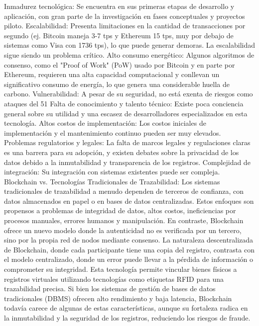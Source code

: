 Inmadurez tecnológica: Se encuentra en sus primeras etapas de desarrollo y aplicación, con gran parte de la investigación en fases conceptuales y proyectos piloto.
Escalabilidad: Presenta limitaciones en la cantidad de transacciones por segundo (ej. Bitcoin maneja 3-7 tps y Ethereum 15 tps, muy por debajo de sistemas como Visa con 1736 tps), lo que puede generar demoras. La escalabilidad sigue siendo un problema crítico.
Alto consumo energético: Algunos algoritmos de consenso, como el "Proof of Work" (PoW) usado por Bitcoin y en parte por Ethereum, requieren una alta capacidad computacional y conllevan un significativo consumo de energía, lo que genera una considerable huella de carbono.
Vulnerabilidad: A pesar de su seguridad, no está exenta de riesgos como ataques del 51%
Falta de conocimiento y talento técnico: Existe poca conciencia general sobre su utilidad y una escasez de desarrolladores especializados en esta tecnología.
Altos costos de implementación: Los costos iniciales de implementación y el mantenimiento continuo pueden ser muy elevados.
Problemas regulatorios y legales: La falta de marcos legales y regulaciones claras es una barrera para su adopción, y existen debates sobre la privacidad de los datos debido a la inmutabilidad y transparencia de los registros.
Complejidad de integración: Su integración con sistemas existentes puede ser compleja.
Blockchain vs. Tecnologías Tradicionales de Trazabilidad: Los sistemas tradicionales de trazabilidad a menudo dependen de terceros de confianza, con datos almacenados en papel o en bases de datos centralizadas. Estos enfoques son propensos a problemas de integridad de datos, altos costos, ineficiencias por procesos manuales, errores humanos y manipulación. En contraste, Blockchain ofrece un nuevo modelo donde la autenticidad no es verificada por un tercero, sino por la propia red de nodos mediante consenso. La naturaleza descentralizada de Blockchain, donde cada participante tiene una copia del registro, contrasta con el modelo centralizado, donde un error puede llevar a la pérdida de información o comprometer su integridad. Esta tecnología permite vincular bienes físicos a registros virtuales utilizando tecnologías como etiquetas RFID para una trazabilidad precisa. Si bien los sistemas de gestión de bases de datos tradicionales (DBMS) ofrecen alto rendimiento y baja latencia, Blockchain todavía carece de algunas de estas características, aunque su fortaleza radica en la inmutabilidad y la seguridad de los registros, reduciendo los riesgos de fraude.

